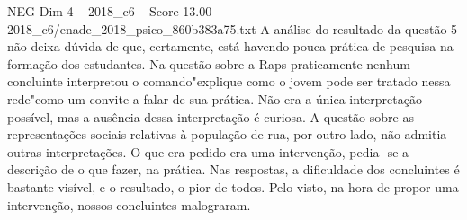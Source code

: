 \begin{textsample}{NEG Dim 4 – 2018\_c6 – Score 13.00 – 2018\_c6/enade\_2018\_psico\_860b383a75.txt}
A análise do resultado da questão 5 não deixa dúvida de que, certamente, está havendo pouca prática de pesquisa na formação dos estudantes.
Na questão sobre a Raps praticamente nenhum concluinte interpretou o comando"explique como o jovem pode ser tratado nessa rede"como um convite a falar de sua prática.
Não era a única interpretação possível, mas a ausência dessa interpretação é curiosa.
A questão sobre as representações sociais relativas à população de rua, por outro lado, não admitia outras interpretações.
O que era pedido era uma intervenção, pedia -se a descrição de o que fazer, na prática.
Nas respostas, a dificuldade dos concluintes é bastante visível, e o resultado, o pior de todos.
Pelo visto, na hora de propor uma intervenção, nossos concluintes malograram.

\end{textsample}
